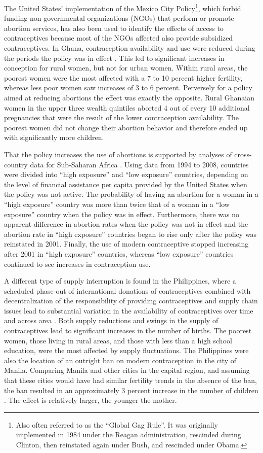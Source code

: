 \documentclass[]{article}
\begin{document}
The United States' implementation of the Mexico City Policy\footnote{Also often referred to as the ``Global Gag Rule''. It was originally implemented in 1984 under the Reagan administration, rescinded during Clinton, then reinstated again under Bush, and rescinded under Obama.}, which forbid funding non-governmental organizations (NGOs) that perform or promote abortion services, has also been used to identify the effects of access to contraceptives because most of the NGOs affected also provide subsidized contraceptives. In Ghana, contraception availability and use were reduced during the periods the policy was in effect \citep{Jones2015}. This led to significant increases in conception for rural women, but not for urban women. Within rural areas, the poorest women were the most affected with a 7 to 10 percent higher fertility, whereas less poor women saw increases of 3 to 6 percent. Perversely for a policy aimed at reducing abortions the effect was exactly the opposite. Rural Ghanaian women in the upper three wealth quintiles aborted 4 out of every 10 additional pregnancies that were the result of the lower contraception availability. The poorest women did not change their abortion behavior and therefore ended up with significantly more children.

That the policy increases the use of abortions is supported by analyses of cross-country data for Sub-Saharan Africa \citep{Bendavid2011}. Using data from 1994 to 2008, countries were divided into ``high exposure'' and ``low exposure'' countries, depending on the level of financial assistance per capita provided by the United States when the policy was not active. The probability of having an abortion for a woman in a ``high exposure'' country was more than twice that of a woman in a ``low exposure'' country when the policy was in effect. Furthermore, there was no apparent difference in abortion rates when the policy was not in effect and the abortion rate in ``high exposure'' countries began to rise only after the policy was reinstated in 2001. Finally, the use of modern contraceptive stopped increasing after 2001 in ``high exposure'' countries, whereas ``low exposure'' countries continued to see increases in contraception use.

A different type of supply interruption is found in the Philippines, where a scheduled phase-out of international donations of contraceptives combined with decentralization of the responsibility of providing contraceptives and supply chain issues lead to substantial variation in the availability of contraceptives over time and across area \citep{Salas2014}. Both supply reductions and swings in the supply of contraceptives lead to significant increases in the number of births. The poorest women, those living in rural areas, and those with less than a high school education, were the most affected by supply fluctuations. The Philippines were also the location of an outright ban on modern contraception in the city of Manila. Comparing Manila and other cities in the capital region, and assuming that these cities would have had similar fertility trends in the absence of the ban, the ban resulted in an approximately 3 percent increase in the number of children \citep{Dumas2017}. The effect is relatively larger, the younger the mother.
\end{document}
